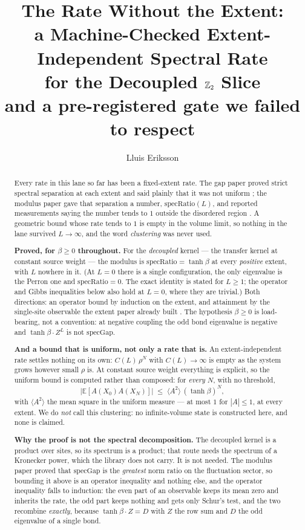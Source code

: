 \documentclass[11pt]{article}
\title{The Rate Without the Extent:\\
a Machine-Checked Extent-Independent Spectral Rate\\
for the Decoupled $\mathbb{Z}_2$ Slice\\
\large and a pre-registered gate we failed to respect}
\author{Lluis Eriksson}
\date{}
\theoremstyle{definition}
\begin{document}
\maketitle

\begin{abstract}
Every rate in this lane so far has been a fixed-extent rate.  The gap paper
proved strict spectral separation at each extent and said plainly that it was
not uniform \cite{ErikssonGap}; the modulus paper gave that separation a
number, $\mathrm{specRatio}(L)$, and reported measurements saying the number
tends to $1$ outside the disordered region \cite{ErikssonSpectral}.  A geometric
bound whose rate tends to $1$ is empty in the volume limit, so nothing in the
lane survived $L\to\infty$, and the word \emph{clustering} was never used.

\textbf{Proved, for $\beta\ge0$ throughout.}  For the \emph{decoupled} kernel ---
the transfer kernel at constant source weight --- the modulus is
$\mathrm{specRatio} = \tanh\beta$ at every \emph{positive} extent, with $L$
nowhere in it.  (At $L=0$ there is a single configuration, the only eigenvalue
is the Perron one and $\mathrm{specRatio}=0$.  The exact identity is stated for
$L\ge1$; the operator and Gibbs inequalities below also hold at $L=0$, where
they are trivial.)  Both directions: an operator bound by induction on the extent, and
attainment by the single-site observable the extent paper already built
\cite{ErikssonExtent}.  The hypothesis $\beta\ge0$ is load-bearing, not a
convention: at negative coupling the odd bond eigenvalue is negative and
$\tanh\beta\cdot Z^L$ is not $\mathrm{specGap}$.

\textbf{And a bound that is uniform, not only a rate that is.}  An
extent-independent rate settles nothing on its own: $C(L)\,\rho^N$ with
$C(L)\to\infty$ is empty as the system grows however small $\rho$ is.  At
constant source weight everything is explicit, so the uniform bound is computed
rather than composed: for \emph{every} $N$, with no threshold,
\[
  \bigl|\mathbb{E}[A(X_0)A(X_N)]\bigr| \;\le\; \langle A^2\rangle\,(\tanh\beta)^N ,
\]
with $\langle A^2\rangle$ the mean square in the uniform measure --- at most $1$
for $|A|\le1$, at every extent.  We do \emph{not} call this clustering: no
infinite-volume state is constructed here, and none is claimed.

\textbf{Why the proof is not the spectral decomposition.}  The decoupled kernel
is a product over sites, so its spectrum is a product; that route needs the
spectrum of a Kronecker power, which the library does not carry.  It is not
needed.  The modulus paper proved that $\mathrm{specGap}$ is the \emph{greatest}
norm ratio on the fluctuation sector, so bounding it above is an operator
inequality and nothing else, and the operator inequality falls to induction: the
even part of an observable keeps its mean zero and inherits the rate, the odd
part keeps nothing and gets only Schur's test, and the two recombine
\emph{exactly}, because $\tanh\beta \cdot Z = D$ with $Z$ the row sum and $D$
the odd eigenvalue of a single bond.


\end{abstract}
\end{document}
